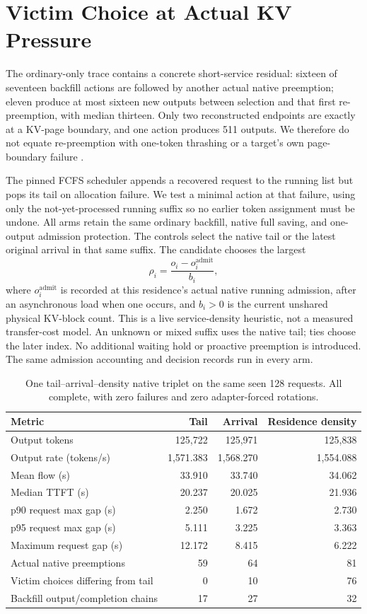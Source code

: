 \documentclass[10pt]{article}
\begin{document}
\section{Victim Choice at Actual KV Pressure}
The ordinary-only trace contains a concrete short-service residual: sixteen of seventeen backfill actions are followed by another actual native preemption; eleven produce at most sixteen new outputs between selection and that first re-preemption, with median thirteen. Only two reconstructed endpoints are exactly at a KV-page boundary, and one action produces 511 outputs. We therefore do not equate re-preemption with one-token thrashing or a target's own page-boundary failure \cite{residencyshort}.

The pinned FCFS scheduler appends a recovered request to the running list but pops its tail on allocation failure. We test a minimal action at that failure, using only the not-yet-processed running suffix so no earlier token assignment must be undone. All arms retain the same ordinary backfill, native full saving, and one-output admission protection. The controls select the native tail or the latest original arrival in that same suffix. The candidate chooses the largest
\[
 \rho_i=\frac{o_i-o_i^{\mathrm{admit}}}{b_i},
\]
where $o_i^{\mathrm{admit}}$ is recorded at this residence's actual native running admission, after an asynchronous load when one occurs, and $b_i>0$ is the current unshared physical KV-block count. This is a live service-density heuristic, not a measured transfer-cost model. An unknown or mixed suffix uses the native tail; ties choose the later index. No additional waiting hold or proactive preemption is introduced. The same admission accounting and decision records run in every arm.

\begin{table}[t]
\centering\small
\caption{One tail--arrival--density native triplet on the same seen 128 requests. All complete, with zero failures and zero adapter-forced rotations.}
\label{tab:residency}
\begin{tabular}{lrrr}
\toprule
Metric & Tail & Arrival & Residence density \\
\midrule
Output tokens & 125,722 & 125,971 & 125,838 \\
Output rate (tokens/s) & 1,571.383 & 1,568.270 & 1,554.088 \\
Mean flow (s) & 33.910 & 33.740 & 34.062 \\
Median TTFT (s) & 20.237 & 20.025 & 21.936 \\
p90 request max gap (s) & 2.250 & 1.672 & 2.730 \\
p95 request max gap (s) & 5.111 & 3.225 & 3.363 \\
Maximum request gap (s) & 12.172 & 8.415 & 6.222 \\
Actual native preemptions & 59 & 64 & 81 \\
Victim choices differing from tail & 0 & 10 & 76 \\
Backfill output/completion chains & 17 & 27 & 32 \\
\bottomrule
\end{tabular}
\end{table}
\end{document}
